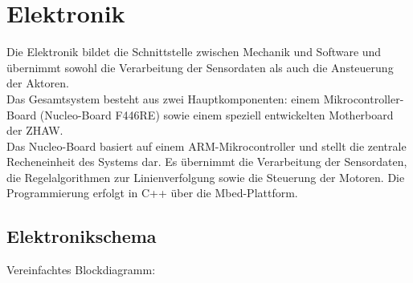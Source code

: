 \documentclass[11pt,a4paper]{article}
\begin{document}
	\newpage
	
\newpage
	\section{Elektronik}
	
	Die Elektronik bildet die Schnittstelle zwischen Mechanik und Software und übernimmt sowohl die Verarbeitung der Sensordaten als auch die Ansteuerung der Aktoren.\\
	Das Gesamtsystem besteht aus zwei Hauptkomponenten: einem Mikrocontroller-Board (Nucleo-Board F446RE) sowie einem speziell entwickelten Motherboard der ZHAW.\\
	Das Nucleo-Board basiert auf einem ARM-Mikrocontroller und stellt die zentrale Recheneinheit des Systems dar. Es übernimmt die Verarbeitung der Sensordaten, die Regelalgorithmen zur Linienverfolgung sowie die Steuerung der Motoren. Die Programmierung erfolgt in C++ über die Mbed-Plattform.\\
	
	
	
	
	\subsection{Elektronikschema}
	Vereinfachtes Blockdiagramm:
	
\end{document}
